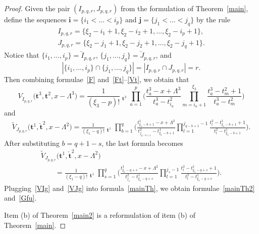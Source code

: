 \documentclass[pdftex]{sigma}
\numberwithin{equation}{section}
\DeclareMathOperator{\Symb}{\overline{Sym} }
\begin{document}
\begin{proof}
Given the pair $(I_{p,q,r},J_{p,q,r})$ from the formulation of Theorem~\ref{main}, define the sequences $\boldsymbol{i}=\{i_1<\dots<i_p\}$ and $\boldsymbol{j}=\{j_1<\dots<j_q\}$ by the rule
\begin{gather*}
I_{p,q,r}=\{\xi_2-i_1+1,\xi_2-i_2+1,\dots,\xi_2-i_p+1\},\\ J_{p,q,r}=\{\xi_2-j_1+1,\xi_2-j_2+1,\dots,\xi_2-j_q+1\}.
\end{gather*}
Notice that
$\{i_1,\dots,i_p\}=\check{I}_{p,q,r}$, $\{j_1,\dots,j_q\}=\check{J}_{p,q,r}$,
and
\begin{equation*}|\{i_1,\dots,i_p\}\cap \{j_1,\dots,j_q\}|=|I_{p,q,r}\cap J_{p,q,r}|=r.\end{equation*}
Then combining formulae~\eqref{F} and~\eqref{Ft}--\eqref{Vt}, we obtain that
\begin{equation}\label{VIg}
V_{\check{I}_{p,q,r}}\bigl(\boldsymbol{t}^3,\boldsymbol{t}^2,x-\Lambda^3\bigr)=\frac{1}{(\xi_3-p)!}\Symb_{\boldsymbol{t}^3}
\prod_{a=1}^{p} \Biggl(\frac{t^3_a-x+\Lambda^3}{t_a^3-t^2_{i_a}}\prod_{ m=i_a+1}^{\xi_2} \frac{t_a^3-t^2_m+1}{t_a^3-t^2_m}\Biggr)
\end{equation}
and
\begin{gather*}
\widetilde{V}_{J_{p,q,r}}\bigl(\boldsymbol{t}^1,\check{\boldsymbol{t}}^2,x-\Lambda^2\bigr)=\frac{1}{(\xi_1-q)!}\Symb_{\boldsymbol{t}^1}
\prod_{b=1}^{q} \Biggl( \frac{t_{\xi_1-b+1}^1-x+\Lambda^2}{t^2_{j_{q-b+1}}-t^1_{\xi_1-b+1}}\prod_{ l=1}^{j_{q-b+1}-1} \frac{t^2_l-t_{\xi_1-b+1}^1+1}{t^2_l-t^1_{\xi_1-b+1}}\Biggr).
\end{gather*}
After substituting $b=q+1-s$, the last formula becomes
\begin{gather}
\widetilde{V}_{J_{p,q,r}}\bigl(\boldsymbol{t}^1,\check{\boldsymbol{t}}^2,x-\Lambda^2\bigr)\nonumber\\
\qquad{}=\frac{1}{(\xi_1-q)!}\Symb_{\boldsymbol{t}^1}
\prod_{s=1}^{q} \Biggl( \frac{t_{\xi_1-q+s}^1-x+\Lambda^2}{t^2_{j_{s}}-t^1_{\xi_1-q+s}}\prod_{ l=1}^{j_s-1} \frac{t^2_l-t_{\xi_1-q+s}^1+1}{t^2_l-t^1_{\xi_1-q+s}}\Biggr).\label{VJg}
\end{gather}
Plugging~\eqref{VIg} and~\eqref{VJg} into formula~\eqref{mainTh}, we obtain formulae~\eqref{mainTh2} and~\eqref{Gfu}.

Item (b) of Theorem~\ref{main2} is a reformulation of item (b) of Theorem~\ref{main}.
\end{proof}
\end{document}
